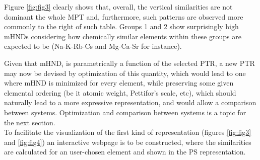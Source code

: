 \documentclass[article]{article}
\begin{document}

Figure \ref{fig:fig3} clearly shows that, overall, the vertical similarities are not dominant the whole MPT and, furthermore, such patterns are observed more commonly to the right of such table. Groups 1 and 2 show surprisingly high mHNDs considering how chemically similar elements within these groups are expected to be (Na-K-Rb-Cs and Mg-Ca-Sr for instance). 

Given that mHND$_i$ is parametrically a function of the selected PTR, a new PTR may now be devised by optimization of this quantity, which would lead to one where mHND is minimized for every element, while preserving some given elemental ordering (be it atomic weight, Pettifor's scale, etc), which should naturally lead to a more expressive representation, and would allow a comparison between systems. Optimization and comparison between systems is a topic for the next section.\\



To facilitate the visualization of the first kind of representation (figures \ref{fig:fig3} and \ref{fig:fig4}) an interactive webpage is to be constructed, where the similarities are calculated for an user-chosen element and shown in the PS representation.
 
 

\renewcommand\refname{References}


\end{document}
